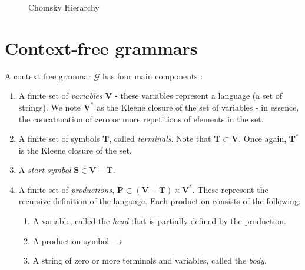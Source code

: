\begin{figure}[h]
    \centering
    \caption{Chomsky Hierarchy}
    \label{fig:chomsky-fig}
\end{figure}

\section{Context-free grammars}
A context free grammar $\mathcal{G}$ has four main components \cite{hopcroft-automata, leeuwen-cfg}:
\begin{enumerate}
    \item A finite set of \emph{variables} $\mathbf{V}$ - these variables represent a language (a set of strings). We note $\mathbf{V}^*$ as the Kleene closure of the set of variables - in essence, the concatenation of zero or more repetitions of elements in the set.
    \item A finite set of symbols $\mathbf{T}$, called \emph{terminals}. Note that $\mathbf{T} \subset \mathbf{V}$. Once again, $\mathbf{T}^*$ is the Kleene closure of the set.
    \item A \emph{start symbol} $\mathbf{S} \in \mathbf{V}-\mathbf{T}$.
    \item A finite set of \emph{productions}, $\mathbf{P} \subset (\mathbf{V}-\mathbf{T})\times \mathbf{V}^*$. These represent the recursive definition of the language. Each production consists of the following:
    \begin{enumerate}
        \item A variable, called the \emph{head} that is partially defined by the production.
        \item A production symbol $\rightarrow$
        \item A string of zero or more terminals and variables, called the \emph{body}.
    \end{enumerate}
\end{enumerate}

